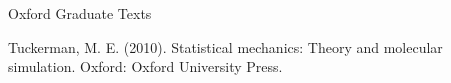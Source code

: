 
Oxford Graduate Texts

Tuckerman, M. E. (2010). Statistical mechanics: Theory and molecular simulation. Oxford: Oxford University Press.

